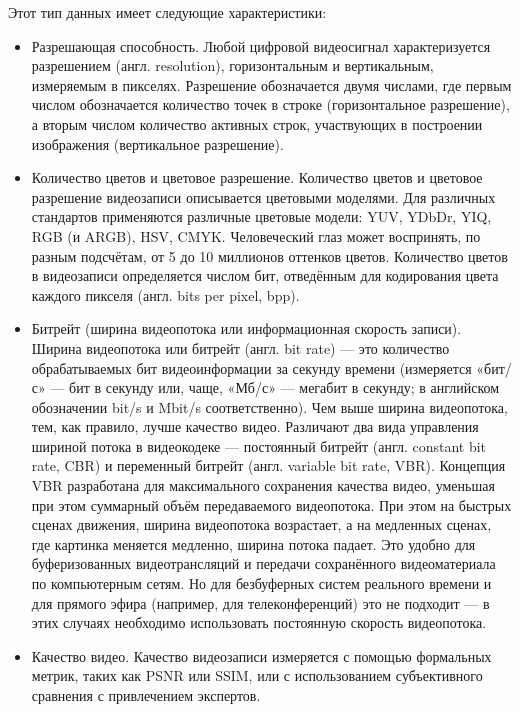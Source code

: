 Этот тип данных имеет следующие характеристики:
\begin{itemize}
\item Разрешающая способность.
Любой цифровой видеосигнал характеризуется разрешением (англ. resolution), 
горизонтальным и вертикальным, измеряемым в пикселях. Разрешение обозначается двумя числами, где
первым числом обозначается количество точек в строке (горизонтальное разрешение), 
а вторым числом количество активных строк, участвующих в построении изображения 
(вертикальное разрешение). 

\item Количество цветов и цветовое разрешение.
Количество цветов и цветовое разрешение видеозаписи описывается цветовыми моделями. 
Для различных стандартов применяются различные цветовые модели: YUV, YDbDr, YIQ, RGB (и ARGB), HSV, CMYK. 
Человеческий глаз может воспринять, по разным подсчётам, от 5 до 10 миллионов оттенков цветов. 
Количество цветов в видеозаписи определяется числом бит, отведённым для кодирования цвета каждого 
пикселя (англ. bits per pixel, bpp). 

\item Битрейт (ширина видеопотока или информационная скорость записи).
Ширина видеопотока или битрейт (англ. bit rate) — это количество обрабатываемых бит 
видеоинформации за секунду времени (измеряется «бит/с» — бит в секунду или, чаще, «Мб/с» — 
мегабит в секунду; в английском обозначении bit/s и Mbit/s соответственно). 
Чем выше ширина видеопотока, тем, как правило, лучше качество видео. 
Различают два вида управления шириной потока в видеокодеке — постоянный битрейт 
(англ. constant bit rate, CBR) и переменный битрейт (англ. variable bit rate, VBR). 
Концепция VBR разработана для максимального сохранения качества видео, 
уменьшая при этом суммарный объём передаваемого видеопотока. 
При этом на быстрых сценах движения, ширина видеопотока возрастает, 
а на медленных сценах, где картинка меняется медленно, ширина потока падает. 
Это удобно для буферизованных видеотрансляций и передачи сохранённого видеоматериала 
по компьютерным сетям. Но для безбуферных систем реального времени и для прямого эфира 
(например, для телеконференций) это не подходит — в этих случаях необходимо 
использовать постоянную скорость видеопотока.

\item Качество видео.
Качество видеозаписи измеряется с помощью формальных метрик, таких как PSNR или SSIM, 
или с использованием субъективного сравнения с привлечением экспертов.


\end{itemize}
